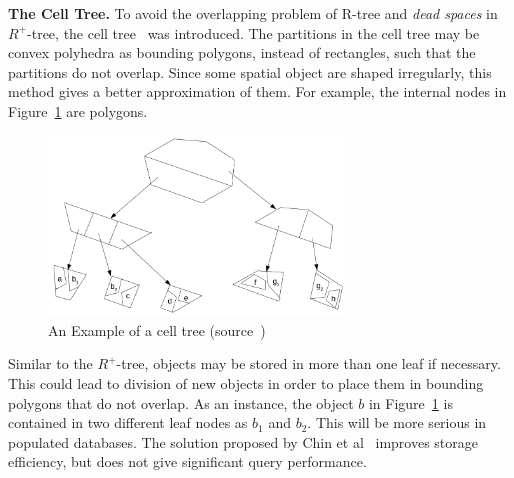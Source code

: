 \documentclass[a4paper,12pt]{article}
\begin{document}
\textbf{The Cell Tree.}
To avoid the overlapping problem of R-tree and \textit{dead spaces} in $R^+$-tree, the cell tree~\cite{celltree} was introduced. The partitions in the cell tree may be convex polyhedra as bounding polygons, instead of rectangles, such that the partitions do not overlap. 
Since some spatial object are shaped irregularly, this method gives a better approximation of them.
For example, the internal nodes in Figure~\ref{figcelltree} are polygons. 
\begin{figure}
\centering
\includegraphics[width=0.7\textwidth]{CellTree}
\caption{An Example of a cell tree (source~\cite{survey})}
\label{figcelltree}
\end{figure} 

Similar to the $R^+$-tree, objects may be stored in more than one leaf if necessary. This could lead to division of new objects in order to place them in bounding polygons that do not overlap. 
As an instance, the object $b$ in Figure~\ref{figcelltree} is contained in two different leaf nodes as $b_1$ and $b_2$.
This will be more serious in populated databases. The solution proposed by Chin et al~\cite{survey} improves storage efficiency, but does not give significant query performance. 
\end{document}
